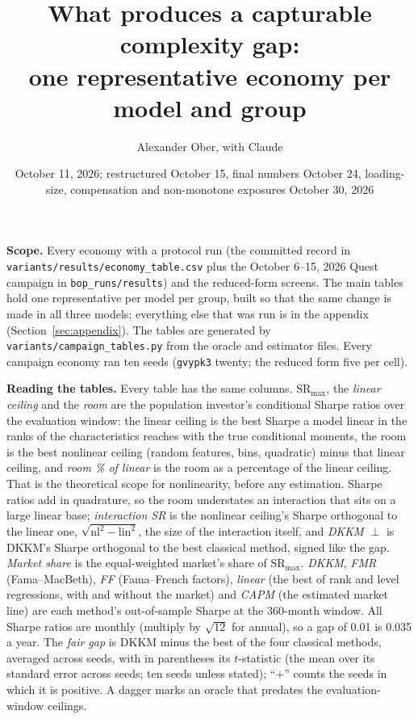 \documentclass[11pt]{article}
\title{What produces a capturable complexity gap:\\one representative economy per model and group}
\author{Alexander Ober, with Claude}
\date{October 11, 2026; restructured October 15, final numbers October 24, loading-size, compensation and non-monotone exposures October 30, 2026}
\begin{document}
\maketitle

{\sloppy\noindent\textbf{Scope.} Every economy with a protocol run (the committed record in \texttt{variants/results/economy\_table.csv} plus the October 6--15, 2026 Quest campaign in \texttt{bop\_runs/results}) and the reduced-form screens. The main tables hold one representative per model per group, built so that the same change is made in all three models; everything else that was run is in the appendix (Section~\ref{sec:appendix}). The tables are generated by \texttt{variants/campaign\_tables.py} from the oracle and estimator files. Every campaign economy ran ten seeds (\texttt{gvypk3} twenty; the reduced form five per cell).

\noindent\textbf{Reading the tables.} Every table has the same columns. $\mathrm{SR}_{\max}$, the \emph{linear ceiling} and the \emph{room} are the population investor's conditional Sharpe ratios over the evaluation window: the linear ceiling is the best Sharpe a model linear in the ranks of the characteristics reaches with the true conditional moments, the room is the best nonlinear ceiling (random features, bins, quadratic) minus that linear ceiling, and \emph{room \% of linear} is the room as a percentage of the linear ceiling. That is the theoretical scope for nonlinearity, before any estimation. Sharpe ratios add in quadrature, so the room understates an interaction that sits on a large linear base; \emph{interaction SR} is the nonlinear ceiling's Sharpe orthogonal to the linear one, $\sqrt{\mathrm{nl}^2-\mathrm{lin}^2}$, the size of the interaction itself, and \emph{DKKM $\perp$} is DKKM's Sharpe orthogonal to the best classical method, signed like the gap. \emph{Market share} is the equal-weighted market's share of $\mathrm{SR}_{\max}$. \emph{DKKM}, \emph{FMR} (Fama--MacBeth), \emph{FF} (Fama--French factors), \emph{linear} (the best of rank and level regressions, with and without the market) and \emph{CAPM} (the estimated market line) are each method's out-of-sample Sharpe at the 360-month window. All Sharpe ratios are monthly (multiply by $\sqrt{12}$ for annual), so a gap of 0.01 is 0.035 a year. The \emph{fair gap} is DKKM minus the best of the four classical methods, averaged across seeds, with in parentheses its $t$-statistic (the mean over its standard error across seeds; ten seeds unless stated); ``$+$'' counts the seeds in which it is positive. A dagger marks an oracle that predates the evaluation-window ceilings.\par}
\end{document}
